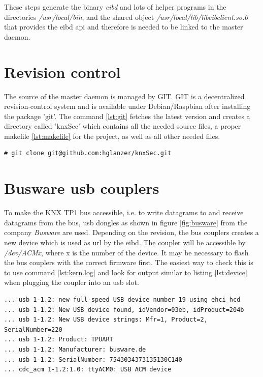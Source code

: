 These steps generate the binary \textit{eibd} and lots of helper programs in the directories \textit{/usr/local/bin}, and the shared object
\textit{/usr/local/lib/libeibclient.so.0} that provides the \gls{eibd} \gls{api} and therefore is needed to be linked to the master daemon. 

\section{Revision control}

The source of the master daemon is managed by GIT. GIT is a decentralized revision-control system and is available under Debian/Raspbian after installing
the package 'git'. The command \ref{lst:git} fetches the latest version and creates a directory called 'knxSec' which contains all the needed source files,
a proper makefile \ref{lst:makefile} for the project, as well as all other needed files.

\begin{lstlisting}[style=BashInputStyle,label=lst:git]
    # git clone git@github.com:hglanzer/knxSec.git
\end{lstlisting}

\section{Busware \gls{usb} couplers}

To make the KNX TP1 bus accessible, i.e. to write datagrams to and receive datagrams from the bus, \gls{usb} dongles as shown in figure \ref{fig:busware}
from the company \textit{Busware} are used. Depending on the revision, the bus couplers creates a new device which is used as \gls{url} by the \gls{eibd}.
The coupler will be accessible by \textit{/dev/ACMx}, where x is the number of the device. It may be necessary to flash the bus couplers with the correct
firmware first. The easiest way to check this is to use command \ref{lst:kern.log} and look for output similar to listing \ref{lst:device} when plugging 
the coupler into an \gls{usb} slot.

\begin{lstlisting}[style=BashInputStyle,label=lst:device]
... usb 1-1.2: new full-speed USB device number 19 using ehci_hcd
... usb 1-1.2: New USB device found, idVendor=03eb, idProduct=204b
... usb 1-1.2: New USB device strings: Mfr=1, Product=2, SerialNumber=220
... usb 1-1.2: Product: TPUART
... usb 1-1.2: Manufacturer: busware.de
... usb 1-1.2: SerialNumber: 7543034373135130C140
... cdc_acm 1-1.2:1.0: ttyACM0: USB ACM device
\end{lstlisting}

